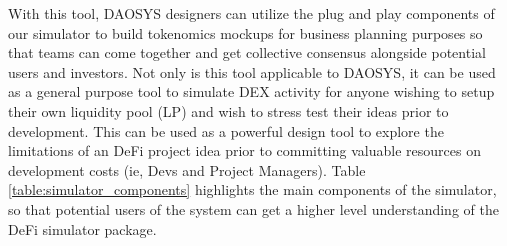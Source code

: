 \documentclass[journal,twocolumn,12pt]{ieeesyscoin}
\begin{document}
With this tool, DAOSYS designers can utilize the plug and play components of our simulator to build tokenomics mockups for business planning purposes so that teams can come together and get collective consensus alongside potential users and investors. Not only is this tool applicable to DAOSYS, it can be used as a general purpose tool to simulate DEX activity for anyone wishing to setup their own liquidity pool (LP) and wish to stress test their ideas prior to development. This can be used as a powerful design tool to explore the limitations of an DeFi project idea prior to committing valuable resources on development costs (ie, Devs and Project Managers). Table \ref{table:simulator_components} highlights the main components of the simulator, so that potential users of the system can get a higher level understanding of the DeFi simulator package.
\end{document}
